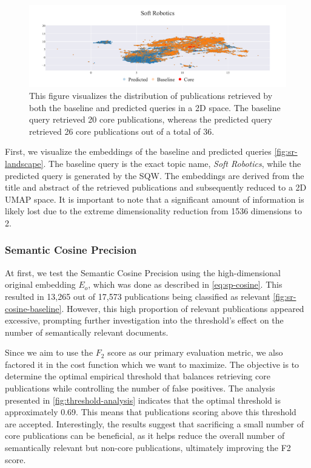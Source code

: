\begin{figure}[!ht]
	\hspace*{-1cm}	
	\includegraphics[scale=0.45]{pics/sr-landscape.pdf}
	\caption[Embedding of Soft Robotics]{This figure visualizes the distribution of publications retrieved by both the baseline and predicted queries in a 2D space. The baseline query retrieved 20 core publications, whereas the predicted query retrieved 26 core publications out of a total of 36.}\label{fig:sr-landscape}
\end{figure}

First, we visualize the embeddings of the baseline and predicted queries \autoref{fig:sr-landscape}. The baseline query is the exact topic name, \textit{Soft Robotics}, while the predicted query is generated by the SQW. The embeddings are derived from the title and abstract of the retrieved publications and subsequently reduced to a 2D UMAP \autocite{Healy2024} space. It is important to note that a significant amount of information is likely lost due to the extreme dimensionality reduction from 1536 dimensions to 2.

\subsubsection{Semantic Cosine Precision}

At first, we test the Semantic Cosine Precision using the high-dimensional original embedding $E_o$, which was done as described in \autoref{eq:sp-cosine}. This resulted in 13,265 out of 17,573 publications being classified as relevant \autoref{fig:sr-cosine-baseline}. However, this high proportion of relevant publications appeared excessive, prompting further investigation into the threshold's effect on the number of semantically relevant documents.

Since we aim to use the $F_2$ score as our primary evaluation metric, we also factored it in the cost function which we want to maximize. The objective is to determine the optimal empirical threshold that balances retrieving core publications while controlling the number of false positives. The analysis presented in \autoref{fig:threshold-analysis} indicates that the optimal threshold is approximately 0.69. This means that publications scoring above this threshold are accepted. Interestingly, the results suggest that sacrificing a small number of core publications can be beneficial, as it helps reduce the overall number of semantically relevant but non-core publications, ultimately improving the F2 score.

